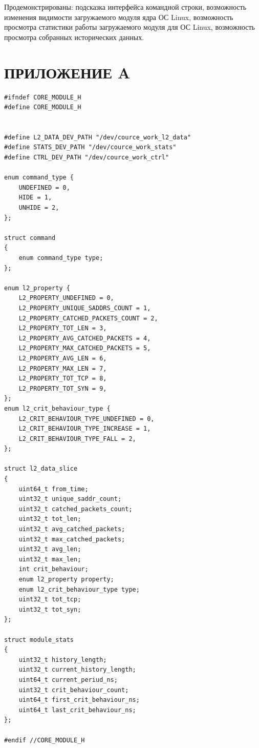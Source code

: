 \documentclass{bmstu}
\begin{document}
Продемонстрированы: подсказка интерфейса командной строки, возможность изменения видимости загружаемого модуля ядра ОС Linux, возможность просмотра статистики работы загружаемого модуля для ОС Linux, возможность просмотра собранных исторических данных.
\makebibliography

\chapter*{ПРИЛОЖЕНИЕ A}
\begin{lstlisting}[caption = {core\_module.h}]
#ifndef CORE_MODULE_H
#define CORE_MODULE_H


#define L2_DATA_DEV_PATH "/dev/cource_work_l2_data"
#define STATS_DEV_PATH "/dev/cource_work_stats"
#define CTRL_DEV_PATH "/dev/cource_work_ctrl"

enum command_type {
    UNDEFINED = 0,
    HIDE = 1,
    UNHIDE = 2,
};

struct command
{
    enum command_type type;
};

enum l2_property {
    L2_PROPERTY_UNDEFINED = 0,
    L2_PROPERTY_UNIQUE_SADDRS_COUNT = 1,
    L2_PROPERTY_CATCHED_PACKETS_COUNT = 2,
    L2_PROPERTY_TOT_LEN = 3,
    L2_PROPERTY_AVG_CATCHED_PACKETS = 4,
    L2_PROPERTY_MAX_CATCHED_PACKETS = 5,
    L2_PROPERTY_AVG_LEN = 6,
    L2_PROPERTY_MAX_LEN = 7,
    L2_PROPERTY_TOT_TCP = 8,
    L2_PROPERTY_TOT_SYN = 9,
};
enum l2_crit_behaviour_type {
    L2_CRIT_BEHAVIOUR_TYPE_UNDEFINED = 0,
    L2_CRIT_BEHAVIOUR_TYPE_INCREASE = 1,
    L2_CRIT_BEHAVIOUR_TYPE_FALL = 2,
};

struct l2_data_slice
{
    uint64_t from_time;
    uint32_t unique_saddr_count;
    uint32_t catched_packets_count;
    uint32_t tot_len;
    uint32_t avg_catched_packets;
    uint32_t max_catched_packets;
    uint32_t avg_len;
    uint32_t max_len;
    int crit_behaviour;
    enum l2_property property;
    enum l2_crit_behaviour_type type;
    uint32_t tot_tcp;
    uint32_t tot_syn;
};

struct module_stats
{
    uint32_t history_length;
    uint32_t current_history_length;
    uint64_t current_periud_ns;
    uint32_t crit_behaviour_count;
    uint64_t first_crit_behaviour_ns;
    uint64_t last_crit_behaviour_ns;
};

#endif //CORE_MODULE_H
\end{lstlisting}
\end{document}
